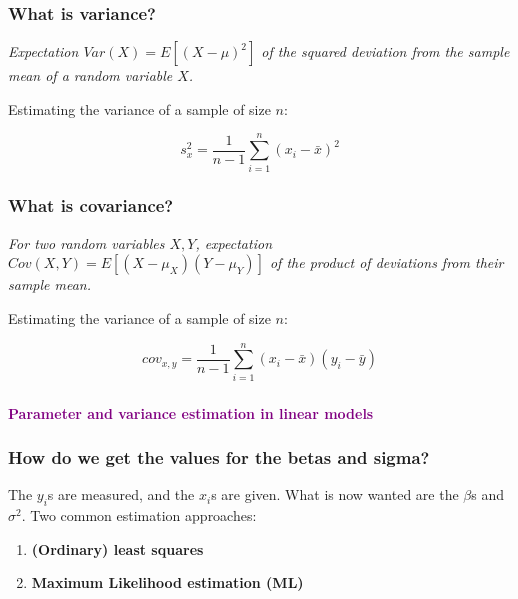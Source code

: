 \documentclass{beamer}
\begin{document}
\begin{frame}
    \frametitle{What is variance?}

\textit{Expectation $Var(X) = E[(X - \mu)^2]$ of the squared deviation from the sample mean of a random variable $X$.}

\vspace{1cm}
Estimating the variance of a sample of size $n$:

\begin{equation*}
        s_x^2 = \frac{1}{n-1} \sum_{i=1}^{n} (x_i - \bar{x})^2 
\end{equation*}



\end{frame}

\begin{frame}
    \frametitle{What is covariance?}
    
\textit{For two random variables $X, Y$, expectation $Cov(X, Y) = E[(X - \mu_X)(Y - \mu_Y)]$ of the product of deviations from their sample mean.}

\vspace{1cm}
Estimating the variance of a sample of size $n$:

\begin{equation*}
        cov_{x,y} = \frac{1}{n-1} \sum_{i=1}^{n} (x_i - \bar{x})(y_i - \bar{y})
\end{equation*}

\end{frame}

\begin{frame}
    \frametitle{}
    \begin{center}
        \huge\textbf{\textcolor{purple}{Parameter and variance estimation in linear models}}
    \end{center}
\end{frame}

\begin{frame}
    \frametitle{How do we get the values for the betas and sigma?}
    The $y_i$s are measured, and the $x_i$s are given. What is now wanted are the $\beta$s and $\sigma^2$. Two common estimation approaches:
    \begin{enumerate}
        \item \textbf{(Ordinary) least squares}
        \item \textbf{Maximum Likelihood estimation (ML)}
    \end{enumerate}
\end{frame}
\end{document}

